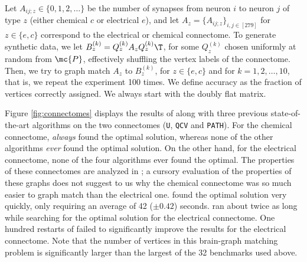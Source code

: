 \documentclass[10pt,journal,cspaper,compsoc]{IEEEtran}
\begin{document}
Let $A_{ij;z} \in \{0,1,2,\ldots\}$ be the number of synapses from neuron $i$ to neuron $j$ of type $z$ (either chemical $c$ or electrical $e$), and let $A_z=\{A_{ij;z}\}_{i,j \in [279]}$ for $z \in \{e,c\}$ correspond to the electrical or chemical connectome.  To generate synthetic data, we let $B_z^{(k)}=Q_z^{(k)} A_z {Q_z^{(k)}}\T$, for some $Q_z^{(k)}$ chosen uniformly at random from $\mc{P}$, effectively shuffling the vertex labels of the connectome.  Then, we try to graph match $A_z$ to $B_z^{(k)}$, for $z \in \{e,c\}$ and for $k =1,2,\ldots, 10$, that is, we repeat the experiment 100 times.  We define accuracy as the fraction of vertices correctly assigned. We always start with the doubly flat matrix.


Figure \ref{fig:connectomes} displays the results of \FAQ along with three previous state-of-the-art algorithms on the two connectomes (\texttt{U}, \texttt{QCV} and \texttt{PATH}).  For the chemical connectome, \FAQ \emph{always} found the optimal solution, whereas none of the other algorithms \emph{ever} found the optimal solution.  On the other hand, for the electrical connectome, none of the four algorithms ever found the optimal.
The properties of these connectomes are analyzed in \cite{Varshney2011}; a cursory evaluation of the properties of these graphs does not suggest to us why the chemical connectome was so much easier to graph match than the electrical one. \FAQ found the optimal solution very quickly, only requiring an average of 42 ($\pm 0.42$) seconds.  \FAQ ran about twice as long while searching for the optimal solution for the electrical connectome. 
One hundred restarts of \FAQ failed to significantly improve the results for the electrical connectome. 
Note that the number of vertices in this brain-graph matching problem is significantly larger than the largest of the 32 benchmarks used above. 
\end{document}

